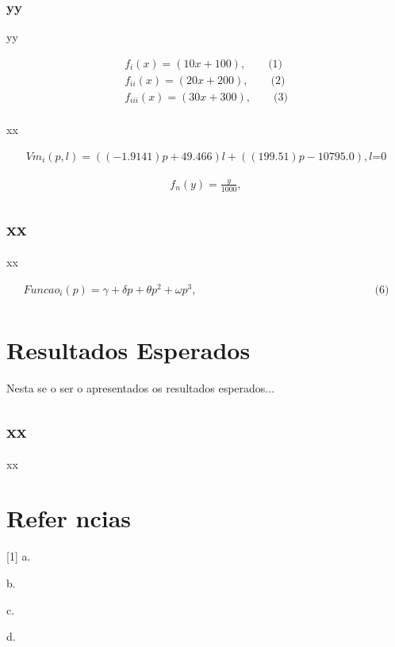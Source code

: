 \documentclass{article}
\begin{document}
\newpage
\subsubsection{yy}

yy

\begin{align*}
f_{i}(x) = (10x + 100), \qquad \text{(1)} \tag{1}\\
f_{ii}(x) = (20x + 200), \qquad \text{(2)} \tag{2} \\
f_{iii}(x) = (30x + 300), \qquad \text{(3)} \tag{3} \\
\end{align*} %

xx

\begin{align*}
Vm_{i}(p,l) = ((-1.9141)p + 49.466)l + ((199.51)p - 10795.0), \text {$l$=0} \tag{4}
\end{align*}

\begin{align*}
f_{n}(y) = \frac{y}{1000}, \tag{5}
\end{align*}

\subsection{xx}

xx

\begin{align*} 
Funcao_{i}(p) = \gamma + \delta p + \theta p^2 + \omega p^3, \qquad \qquad \qquad \qquad \qquad \qquad \qquad \qquad \text{(6)} \tag{6} \\
\end{align*} %

\newpage
\section{Resultados Esperados}

Nesta se o ser o apresentados os resultados esperados...

\subsection{xx}

xx

\newpage
\section{Refer ncias}

[1] a.

\noindent [2] b.

\noindent [3] c.

\noindent [4] d.
\end{document}
